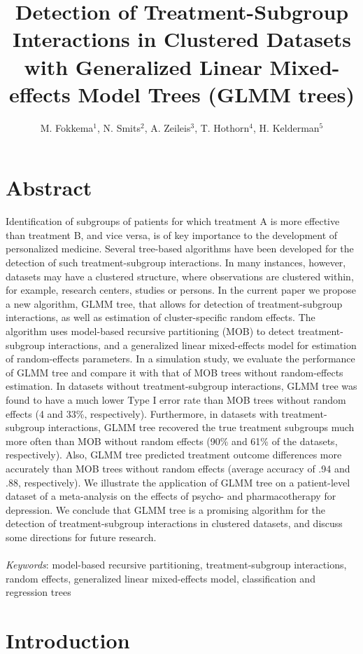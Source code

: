 \documentclass[nobf,doc]{apa}
\title{Detection of Treatment-Subgroup Interactions in Clustered Datasets with Generalized Linear Mixed-effects Model Trees (GLMM trees)}
\author{M. Fokkema$^1$, N. Smits$^2$, A. Zeileis$^3$, T. Hothorn$^4$, H. Kelderman$^5$}
\affiliation{$^1$Universiteit Leiden, $^2$Universiteit van Amsterdam, $^3$Universit\"{a}t Innsbruck, $^4$Universit\"{a}t Z\"{u}rich, $^5$Universiteit Leiden and Vrije Universiteit, Amsterdam}
\begin{document}
\maketitle
\pagewiselinenumbers

\section{Abstract}
Identification of subgroups of patients for which treatment A is more effective than treatment B, and vice versa, is of key importance to the development of personalized medicine. Several tree-based algorithms have been developed for the detection of such treatment-subgroup interactions. In many instances, however, datasets may have a clustered structure, where observations are clustered within, for example, research centers, studies or persons. In the current paper we propose a new algorithm, GLMM tree, that allows for detection of treatment-subgroup interactions, as well as estimation of cluster-specific random effects. The algorithm uses model-based recursive partitioning (MOB) to detect treatment-subgroup interactions, and a generalized linear mixed-effects model for estimation of random-effects parameters. In a simulation study, we evaluate the performance of GLMM tree and compare it with that of MOB trees without random-effects estimation. In datasets without treatment-subgroup interactions, GLMM tree was found to have a much lower Type I error rate than MOB trees without random effects (4 and 33\%, respectively). Furthermore, in datasets with treatment-subgroup interactions, GLMM tree recovered the true treatment subgroups much more often than MOB without random effects (90\% and 61\% of the datasets, respectively). Also, GLMM tree predicted treatment outcome differences more accurately than MOB trees without random effects (average accuracy of .94 and .88, respectively). We illustrate the application of GLMM tree on a patient-level dataset of a meta-analysis on the effects of psycho- and pharmacotherapy for depression. We conclude that GLMM tree is a promising algorithm for the detection of treatment-subgroup interactions in clustered datasets, and discuss some directions for future research.\\
\\
\textit{Keywords}: model-based recursive partitioning, treatment-subgroup interactions, random effects, generalized linear mixed-effects model, classification and regression trees


\section{Introduction}
\end{document}
